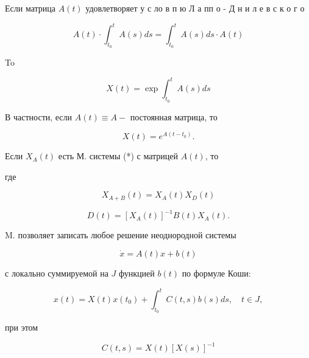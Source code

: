\documentclass[10pt]{article}
\begin{document}
Если матрица $A(t)$ удовлетворяет у с ло в п ю Л а пп о - Д н и л е в с к о г о



\[

A(t) \cdot \int_{t_{0}}^{t} A(s) d s=\int_{t_{0}}^{t} A(s) d s \cdot A(t)

\]



To



\[

X(t)=\exp \int_{t_{0}}^{t} A(s) d s

\]



В частности, если $A(t) \equiv A-$ постоянная матрица, то



\[

X(t)=e^{A\left(t-t_{0}\right)} .

\]



Если $X_{A}(t)$ есть М. системы (*) с матрицей $A(t)$, то



где



\[

X_{A+B}(t)=X_{A}(t) X_{D}(t)

\]



\[

D(t)=\left[X_{A}(t)\right]^{-1} B(t) X_{A}(t) .

\]



M. позволяет записать любое решение неоднородной системы



\[

\dot{x}=A(t) x+b(t)

\]



с локально суммируемой на $J$ функцией $b(t)$ по формуле Коши:



\[

x(t)=X(t) x\left(t_{0}\right)+\int_{t_{0}}^{t} C(t, s) b(s) d s, \quad t \in J,

\]



при этом



\[

C(t, s)=X(t)[X(s)]^{-1}

\]
\end{document}
